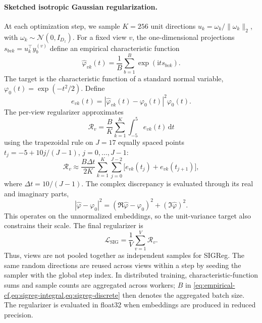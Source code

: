 \documentclass{article}
\begin{document}
\paragraph{Sketched isotropic Gaussian regularization.}
At each optimization step, we sample $K=256$ unit directions
$u_k=\omega_k/\|\omega_k\|_2$, with
$\omega_k\sim\mathcal{N}(0,I_{D_z})$.
For a fixed view $v$, the one-dimensional projections
$s_{bvk}=u_k^\top y_b^{(v)}$ define an empirical characteristic function
\begin{equation}
    \widehat\varphi_{vk}(t)
       =\frac{1}{B}\sum_{b=1}^{B}\exp(\mathrm{i}t s_{bvk}).
    \label{eq:empirical-cf}
\end{equation}
The target is the characteristic function of a standard normal variable,
$\varphi_0(t)=\exp(-t^2/2)$. Define
\begin{equation}
    e_{vk}(t)=
      |\widehat\varphi_{vk}(t)-\varphi_0(t)|^2\varphi_0(t).
\end{equation}
The per-view regularizer approximates
\begin{equation}
    \mathcal{R}_v=\frac{B}{K}\sum_{k=1}^{K}
       \int_{-5}^{5}e_{vk}(t)\,\mathrm{d}t
    \label{eq:sigreg-integral}
\end{equation}
using the trapezoidal rule on $J=17$ equally spaced points
$t_j=-5+10j/(J-1)$, $j=0,\ldots,J-1$:
\begin{equation}
    \mathcal{R}_v\approx\frac{B\Delta t}{2K}
      \sum_{k=1}^{K}\sum_{j=0}^{J-2}
      \bigl[e_{vk}(t_j)+e_{vk}(t_{j+1})\bigr],
    \label{eq:sigreg-discrete}
\end{equation}
where $\Delta t=10/(J-1)$.
The complex discrepancy is evaluated through its real and imaginary parts,
\begin{equation}
    |\widehat\varphi-\varphi_0|^2
      =(\Re\widehat\varphi-\varphi_0)^2
        +(\Im\widehat\varphi)^2.
\end{equation}
This operates on the unnormalized embeddings, so the unit-variance target
also constrains their scale. The final regularizer is
\begin{equation}
    \mathcal{L}_{\mathrm{SIG}}=\frac{1}{V}\sum_{v=1}^{V}\mathcal{R}_v.
    \label{eq:sigreg-views}
\end{equation}
Thus, views are not pooled together as independent samples for SIGReg.
The same random directions are reused across views within a step by seeding
the sampler with the global step index. In distributed training, characteristic-function sums and sample counts are aggregated
across workers; $B$ in \cref{eq:empirical-cf,eq:sigreg-integral,eq:sigreg-discrete}
then denotes the aggregated batch size. The regularizer is evaluated in
float32 when embeddings are produced in reduced precision.
\end{document}
